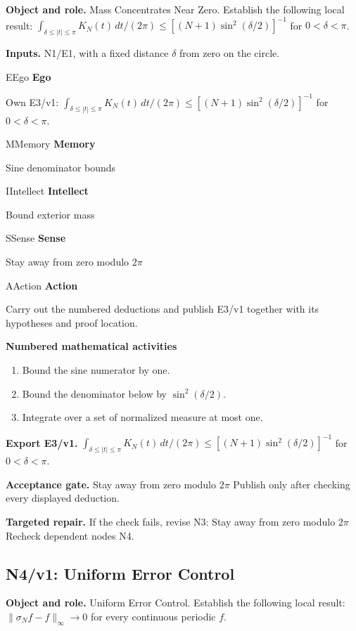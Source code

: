 \documentclass[preprint,12pt,aps,pra,showkeys,amsmath,amssymb,superscriptaddress,floatfix]{revtex4-2}
\theoremstyle{definition}
\theoremstyle{remark}
\newcommand{\mmfaculty}[3]{%
 \begin{mmfacultybox}{#1}{#2}
 {\sffamily\bfseries\color{MMBlue}#2}\par\smallskip #3
 \end{mmfacultybox}}
\newcommand{\field}[2]{\par\smallskip\noindent\textbf{#1.} #2\par}
\begin{document}
\field{Object and role}{Mass Concentrates Near Zero. Establish the following local result:
\(\int_{\delta\le|t|\le\pi}K_N(t)\,dt/(2\pi)\le[(N+1)\sin^2(\delta/2)]^{-1}\)
for \(0<\delta<\pi\).}

\field{Inputs}{N1/E1, with a fixed distance \(\delta\) from zero on the circle.}

\mmfaculty{E}{Ego}{Own E3/v1:
\(\int_{\delta\le|t|\le\pi}K_N(t)\,dt/(2\pi)\le[(N+1)\sin^2(\delta/2)]^{-1}\)
for \(0<\delta<\pi\).}

\mmfaculty{M}{Memory}{Sine denominator bounds}

\mmfaculty{I}{Intellect}{Bound exterior mass}

\mmfaculty{S}{Sense}{Stay away from zero modulo \(2\pi\)}

\mmfaculty{A}{Action}{Carry out the numbered deductions and publish E3/v1 together with its
hypotheses and proof location.}

\smallskip\noindent\textbf{Numbered mathematical activities}

\begin{enumerate}[label=N3.\arabic*,leftmargin=3.4em]

\item Bound the sine numerator by one.

\item Bound the denominator below by \(\sin^2(\delta/2)\).

\item Integrate over a set of normalized measure at most one.

\end{enumerate}

\field{Export E3/v1}{\(\int_{\delta\le|t|\le\pi}K_N(t)\,dt/(2\pi)\le[(N+1)\sin^2(\delta/2)]^{-1}\)
for \(0<\delta<\pi\).}

\field{Acceptance gate}{Stay away from zero modulo \(2\pi\) Publish only after checking every
displayed deduction.}

\field{Targeted repair}{If the check fails, revise N3: Stay away from zero modulo \(2\pi\)
Recheck dependent nodes N4.}

\clearpage

\subsection{N4/v1: Uniform Error Control}

\field{Object and role}{Uniform Error Control. Establish the following local result:
\(\|\sigma_N f-f\|_\infty\to0\) for every continuous periodic \(f\).}
\end{document}
